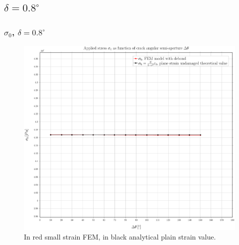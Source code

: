 \documentclass[first,firstsupp,lastsupp,handout,last,hyperref,table]{ETHclass}
\begin{document}

\subsection{$\delta=0.8^{\circ}$}

\begin{frame}
\frametitle{\small $\sigma_{0}$, $\delta=0.8^{\circ}$}
\vspace{-0.5cm}
\centering
\captionsetup[figure]{font=scriptsize,labelfont=scriptsize}
\begin{figure}[!h]
\centering
\includegraphics[height=0.7\textheight]{2017-07-10_AbqRunSummary_SmallStrainD08_sigma-inf_Summary.pdf}
  \caption{\scriptsize In red small strain FEM, in black analytical plain strain value.}
  \label{fig:res1}
\end{figure}
\end{frame}
\end{document}
